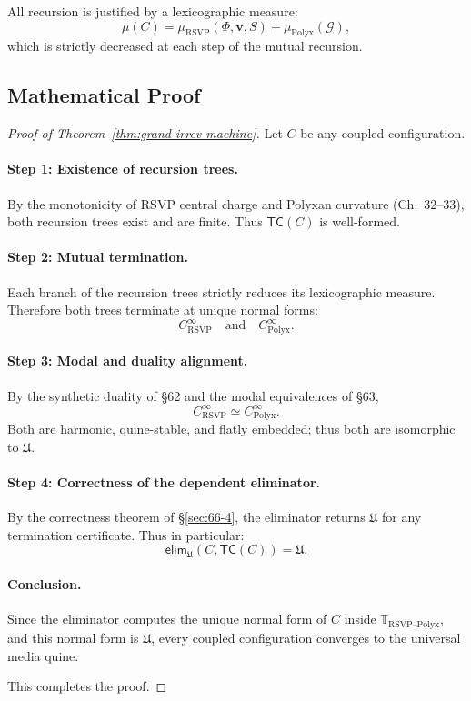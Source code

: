 All recursion is justified by a lexicographic measure:
\[
   \mu(C) = 
      \mu_{\mathrm{RSVP}}(\Phi,\mathbf{v},S)
         + \mu_{\mathrm{Polyx}}(\mathcal{G}),
\]
which is strictly decreased at each step of the mutual recursion.

\subsection{Mathematical Proof}

\begin{proof}[Proof of Theorem~\ref{thm:grand-irrev-machine}]
Let $C$ be any coupled configuration.

\paragraph{Step 1: Existence of recursion trees.}
By the monotonicity of RSVP central charge and Polyxan curvature (Ch.~32--33), both recursion trees exist and are finite.  
Thus $\mathsf{TC}(C)$ is well-formed.

\paragraph{Step 2: Mutual termination.}
Each branch of the recursion trees strictly reduces its lexicographic measure.  
Therefore both trees terminate at unique normal forms:
\[
   C_{\mathrm{RSVP}}^{\infty}
      \quad\text{and}\quad
   C_{\mathrm{Polyx}}^{\infty}.
\]

\paragraph{Step 3: Modal and duality alignment.}
By the synthetic duality of \S62 and the modal equivalences of \S63,
\[
   C_{\mathrm{RSVP}}^{\infty}
      \simeq
   C_{\mathrm{Polyx}}^{\infty}.
\]
Both are harmonic, quine-stable, and flatly embedded; thus both are isomorphic to $\mathfrak{U}$.

\paragraph{Step 4: Correctness of the dependent eliminator.}
By the correctness theorem of \S\ref{sec:66-4}, the eliminator returns $\mathfrak{U}$ for any termination certificate.  
Thus in particular:
\[
   \mathsf{elim}_{\mathfrak{U}}(C, \mathsf{TC}(C)) = \mathfrak{U}.
\]

\paragraph{Conclusion.}
Since the eliminator computes the unique normal form of $C$ inside $\mathbb{T}_{\text{RSVP--Polyx}}$, and this normal form is $\mathfrak{U}$, every coupled configuration converges to the universal media quine.

This completes the proof.
\end{proof}

